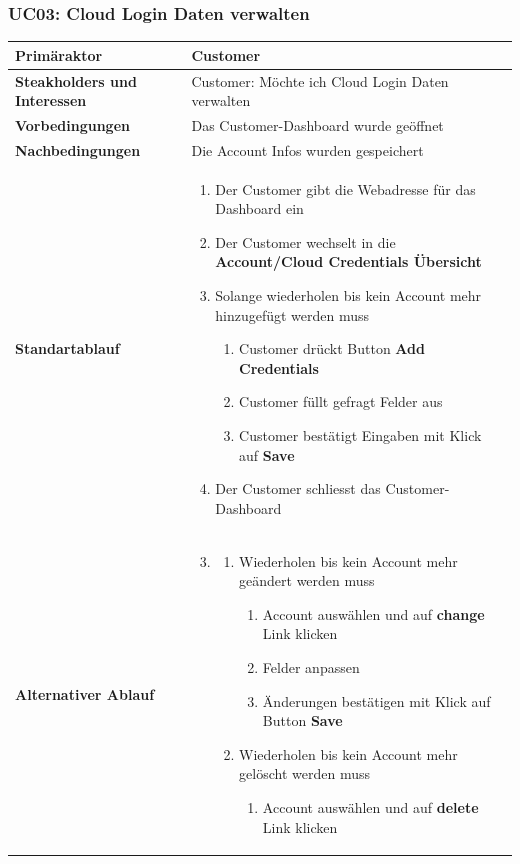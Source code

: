 \documentclass[11pt]{scrartcl}
\begin{document}
\subsubsection{UC03: Cloud Login Daten verwalten}
\begin{longtabu} to \textwidth {X[1,l] X[2,l]}
	\bfseries Primäraktor & Customer  \\\hline 
	\bfseries Steakholders und Interessen & Customer: Möchte ich Cloud Login Daten verwalten  \\\hline 
	\bfseries Vorbedingungen & Das Customer-Dashboard wurde geöffnet  \\\hline 
	\bfseries Nachbedingungen & Die Account Infos wurden gespeichert  \\\hline 
	\bfseries Standartablauf & 
		\begin{enumerate}
			\item Der Customer gibt die Webadresse für das Dashboard ein
			\item Der Customer wechselt in die \textbf{Account/Cloud Credentials Übersicht}
			\item Solange wiederholen bis kein Account mehr hinzugefügt werden muss
			  \begin{enumerate}
			    \item Customer drückt Button \textbf{Add Credentials}
			    \item Customer füllt gefragt Felder aus
			    \item Customer bestätigt Eingaben mit Klick auf \textbf{Save}
			  \end{enumerate}
			\item Der Customer schliesst das Customer-Dashboard
		\end{enumerate}
      \\\hline
      \bfseries Alternativer Ablauf & 
      \begin{enumerate}
          \setcounter{enumi}{2}
            \item 
            \begin{enumerate}
              \item Wiederholen bis kein Account mehr geändert werden muss
                \begin{enumerate}
                  \item Account auswählen und auf \textbf{change} Link klicken
                  \item Felder anpassen
                  \item Änderungen bestätigen mit Klick auf Button \textbf{Save}
                \end{enumerate}
                \item Wiederholen bis kein Account mehr gelöscht werden muss
                \begin{enumerate}
                  \item Account auswählen und auf \textbf{delete} Link klicken
                \end{enumerate}
            \end{enumerate}
            

\end{enumerate}
\end{longtabu}
\end{document}
